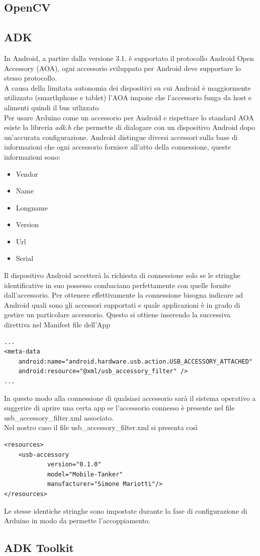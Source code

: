 \subsection {OpenCV}
\subsection {ADK}
In Android, a partire dalla versione 3.1, è supportato il protocollo Android Open 
Accessory (AOA), 
ogni accessorio sviluppato per Android deve supportare lo stesso protocollo. 
\\A causa della limitata autonomia dei dispositivi su cui Android è maggiormente 
utilizzato (smarthphone e tablet) l'AOA impone che l'accessorio funga da host 
e alimenti quindi il bus utlizzato
\\Per usare Arduino come un accessorio per Android e rispettare lo standard AOA 
esiste la libreria \textit{adk.h} che permette di dialogare con un dispositivo 
Android dopo un'accurata configurazione. Android distingue diversi accessori 
sulla base di informazioni che ogni accessorio fornisce all'atto della connessione, 
queste informazioni sono:
\begin{itemize}
\item Vendor
\item Name
\item Longname
\item Version
\item Url
\item Serial
\end{itemize} 
Il dispositivo Android accetterà la richiesta di connessione solo se le stringhe 
identificative in suo possesso combaciano perfettamente con quelle fornite 
dall'accessorio. Per ottenere effettivamente la connessione bisogna indicare ad 
Android quali sono gli accessori supportati e quale applicazioni è in grado di 
gestire un particolare accessorio. Questo si ottiene inserendo la successiva 
direttiva nel Manifest file dell'App

\lstset{language=XML}

\begin{lstlisting}[caption=Porzione del Manifest file dell'App]
...
<meta-data
    android:name="android.hardware.usb.action.USB_ACCESSORY_ATTACHED"
    android:resource="@xml/usb_accessory_filter" />
...
\end{lstlisting}
In questo modo alla connessione di qualsiasi accessorio sarà il sistema operativo
a suggerire di aprire una certa app se l'accessorio connesso è presente nel file 
usb\_accessory\_filter.xml associato.
\\Nel nostro caso il file usb\_accessory\_filter.xml si presenta così
\begin{lstlisting}[caption=usb\_accessory\_filter.xml]
<resources>
    <usb-accessory
            version="0.1.0"
            model="Mobile-Tanker"
            manufacturer="Simone Mariotti"/>
</resources>
\end{lstlisting}
Le stesse identiche stringhe sono impostate durante la fase di configurazione di 
Arduino in modo da permette l'accoppiamento.
\subsection {ADK Toolkit}
